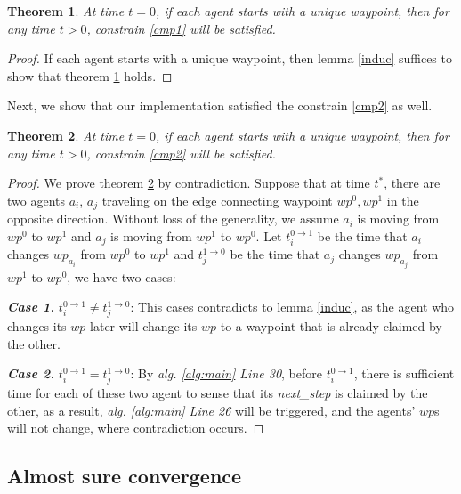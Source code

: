 \documentclass[journal]{IEEEtran}
\newtheorem{theorem}{Theorem}[subsection]
\begin{document}
\begin{theorem}
At time $t=0$, if each agent starts with a unique waypoint, then for any time $t>0$, constrain \ref{cmp1} will be satisfied.
\label{collision free}
\end{theorem}
\begin{proof}
If each agent starts with a unique waypoint, then lemma \ref{induc} suffices to show that theorem \ref{collision free} holds. 
\end{proof}

Next, we show that our implementation satisfied the constrain \ref{cmp2} as well.


\begin{theorem}
At time $t=0$, if each agent starts with a unique waypoint, then for any time $t>0$, constrain \ref{cmp2} will be satisfied.
\label{collision free2}
\end{theorem}
\begin{proof}
We prove theorem \ref{collision free2} by contradiction. Suppose that at time $t^*$, there are two agents $a_i$, $a_j$ traveling on the edge connecting waypoint $wp^{0}, wp^{1}$ in the opposite direction. Without loss of the generality, we assume $a_i$ is moving from $wp^{0}$ to $wp^{1}$ and $a_j$ is moving from $wp^{1}$ to $wp^{0}$. Let $t_i^{0\rightarrow 1}$ be the time that $a_i$ changes $wp_{a_i}$ from $wp^0$ to $wp^1$ and $t_j^{1\rightarrow 0}$ be the time that $a_j$ changes $wp_{a_j}$ from $wp^1$ to $wp^0$, we have two cases:

\textit{\textbf{Case 1. }} $t_{i}^{0\rightarrow 1} \neq t_{j}^{1\rightarrow 0}$: This cases contradicts to lemma \ref{induc}, as the agent who changes its $wp$ later will change its $wp$ to a waypoint that is already claimed by the other. 


\textit{\textbf{Case 2. }} $t_{i}^{0\rightarrow 1} = t_{j}^{1\rightarrow 0}$: By \textit{alg. \ref{alg:main} Line 30}, before $t_{i}^{0\rightarrow 1}$, there is sufficient time for each of these two agent to sense that its \textit{next\_step} is claimed by the other, as a result, \textit{alg. \ref{alg:main} Line 26} will be triggered, and the agents' $wp$s will not change, where contradiction occurs. 

\end{proof}





\subsection{Almost sure convergence}
\end{document}
